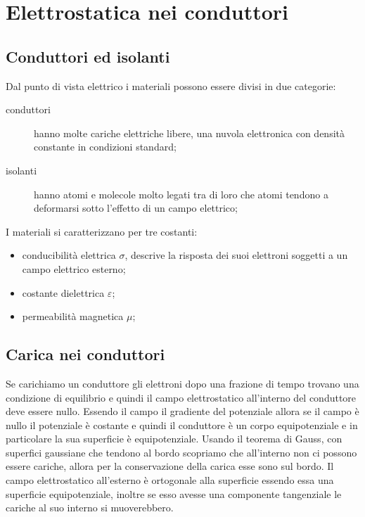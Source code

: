 \chapter{Elettrostatica nei conduttori}
\minitoc
\section{Conduttori ed isolanti}
Dal punto di vista elettrico i materiali possono essere divisi in due categorie:
\begin{description}
  \item[conduttori] hanno molte cariche elettriche libere, una nuvola elettronica con densità constante in condizioni standard;
  \item[isolanti] hanno atomi e molecole molto legati tra di loro che atomi tendono a deformarsi sotto l'effetto di un campo elettrico;
\end{description}
I materiali si caratterizzano per tre costanti:
\begin{itemize}
  \item conducibilità elettrica $\sigma$, descrive la risposta dei suoi elettroni soggetti a un campo elettrico esterno;
  \item costante dielettrica $\varepsilon$;
  \item permeabilità magnetica $\mu$;
\end{itemize}

\section{Carica nei conduttori}
Se carichiamo un conduttore gli elettroni dopo una frazione di tempo trovano una condizione di equilibrio e quindi il campo elettrostatico all'interno del conduttore deve essere nullo. Essendo il campo il gradiente del potenziale allora se il campo è nullo il potenziale è costante e quindi il conduttore è un corpo equipotenziale e in particolare la sua superficie è equipotenziale. Usando il teorema di Gauss, con superfici gaussiane che tendono al bordo scopriamo che all'interno non ci possono essere cariche, allora per la conservazione della carica esse sono sul bordo. Il campo elettrostatico all'esterno è ortogonale alla superficie essendo essa una superficie equipotenziale, inoltre se esso avesse una componente tangenziale le cariche al suo interno si muoverebbero.
